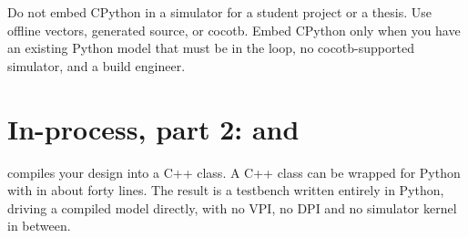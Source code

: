 \begin{ruleofthumb}
Do not embed CPython in a simulator for a student project or a thesis. Use
offline vectors, generated source, or cocotb. Embed CPython only when you
have an existing Python model that must be in the loop, no cocotb-supported
simulator, and a build engineer.
\end{ruleofthumb}

\section{In-process, part 2:  and }
\label{sec:python:pybind}

 compiles your design into a C++ class. A C++ class can be
wrapped for Python with  in about forty lines. The result is a
testbench written entirely in Python, driving a compiled model directly, with
no VPI, no DPI and no simulator kernel in between.

